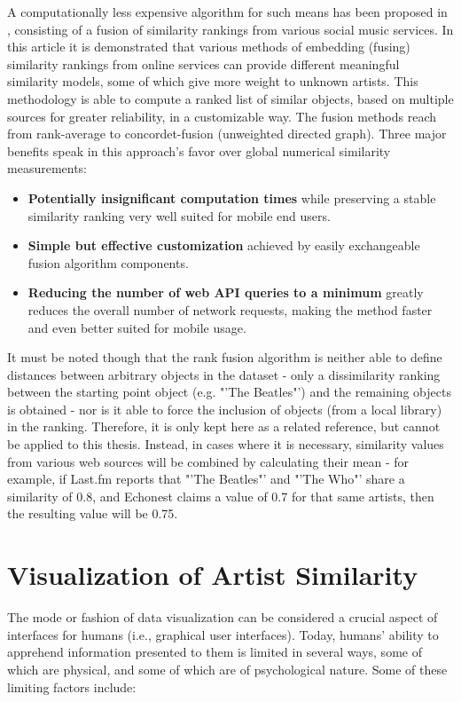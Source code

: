 A computationally less expensive algorithm for such means has been proposed in \cite{Marshall:2010}, consisting of a fusion of similarity rankings from various social music services. In this article it is demonstrated that various methods of embedding (fusing) similarity rankings from online services can provide different meaningful similarity models, some of which give more weight to unknown artists. This methodology is able to compute a ranked list of similar objects, based on multiple sources for greater reliability, in a customizable way. The fusion methods reach from rank-average to concordet-fusion (unweighted directed graph). Three major benefits speak in this approach's favor over global numerical similarity measurements:

\begin{itemize}
	\item \textbf{Potentially insignificant computation times} while preserving a stable similarity ranking very well suited for mobile end users.
	\item \textbf{Simple but effective customization} achieved by easily exchangeable fusion algorithm components.
	\item \textbf{Reducing the number of web API queries to a minimum} greatly reduces the overall number of network requests, making the method faster and even better suited for mobile usage.
\end{itemize}

It must be noted though that the rank fusion algorithm is neither able to define distances between arbitrary objects in the dataset - only a dissimilarity ranking between the starting point object (e.g. "'The Beatles"') and the remaining objects is obtained - nor is it able to force the inclusion of objects (from a local library) in the ranking.
Therefore, it is only kept here as a related reference, but cannot be applied to this thesis. Instead, in cases where it is necessary, similarity values from various web sources will be combined by calculating their mean - for example, if Last.fm reports that "'The Beatles"' and "'The Who"' share a similarity of 0.8, and Echonest claims a value of 0.7 for that same artists, then the resulting value will be 0.75.

\section{Visualization of Artist Similarity}

The mode or fashion of data visualization can be considered a crucial aspect of interfaces for humans (i.e., graphical user interfaces). Today, humans' ability to apprehend information presented to them is limited in several ways, some of which are physical, and some of which are of psychological nature. Some of these limiting factors include:

